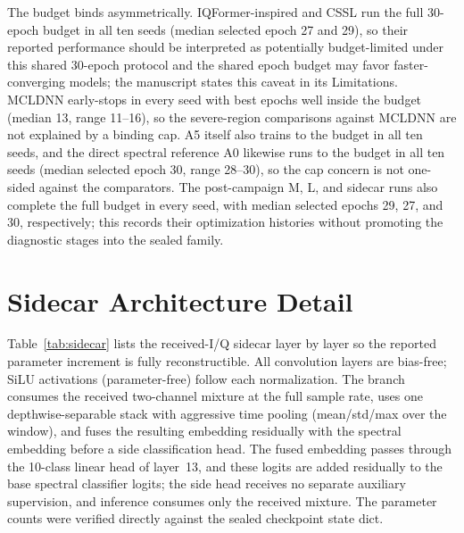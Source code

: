 \documentclass[letterpaper,onecolumn,11pt,journal]{IEEEtran}
\begin{document}
The budget binds asymmetrically. IQFormer-inspired and CSSL run the full
30-epoch budget in all ten seeds (median selected epoch 27 and 29), so their
reported performance should be interpreted as potentially budget-limited under
this shared 30-epoch protocol and the shared epoch budget may favor
faster-converging
models; the manuscript states this caveat in its Limitations. MCLDNN
early-stops in every seed with best epochs well inside the budget (median 13,
range 11--16), so the severe-region comparisons against MCLDNN are not
explained by a binding cap. A5 itself also trains to the budget in all ten
seeds, and the direct spectral reference A0 likewise runs to the budget in
all ten seeds (median selected epoch 30, range 28--30), so the cap concern
is not one-sided against the comparators. The post-campaign M, L, and sidecar runs also
complete the full budget in every seed, with median selected epochs 29, 27,
and 30, respectively; this records their optimization histories without
promoting the diagnostic stages into the sealed family.

\section{Sidecar Architecture Detail}
Table~\ref{tab:sidecar} lists the received-I/Q sidecar layer by layer so the
reported parameter increment is fully reconstructible. All convolution layers
are bias-free; SiLU activations (parameter-free) follow each normalization.
The branch consumes the received two-channel mixture at the full sample rate,
uses one depthwise-separable stack with aggressive time pooling
(mean/std/max over the window), and fuses the resulting embedding residually
with the spectral embedding before a side classification head. The fused
embedding passes through the 10-class linear head of layer~13, and these
logits are added residually to the base spectral classifier logits; the side
head receives no separate auxiliary supervision, and inference consumes only
the received mixture. The parameter
counts were verified directly against the sealed checkpoint state dict.
\end{document}
